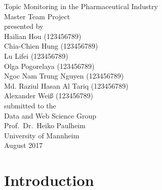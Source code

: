 \documentclass[11pt,titlepage,oneside,openany]{book}
\begin{document}
\begin{titlepage}
	\vspace*{2cm}
  \begin{center}
   {\Large Topic Monitoring in the Pharmaceutical Industry\\}
   \vspace{2cm} 
   {Master Team Project\\}
   \vspace{2cm}
   {presented by\\
    Hailian Hou (123456789)\\
    Chia-Chien Hung (123456789)\\
    Lu Lifei (123456789)\\
    Olga Pogorelaya (123456789)\\
    Ngoc Nam Trung Nguyen (123456789) \\
    Md. Raziul Hasan Al Tariq (123456789)\\
    Alexander Wei{\ss} (123456789)\\
   }
   \vspace{1cm} 
   {submitted to the\\
    Data and Web Science Group\\
    Prof.\ Dr.\ Heiko Paulheim\\
    University of Mannheim\\} \vspace{2cm}
   {August 2017}
  \end{center}
\end{titlepage} 

\tableofcontents
\newpage

\listofalgorithms

\listoffigures

\listoftables

\lstlistoflistings

\printglossary[type=\acronymtype,style=long, nonumberlist]


\newpage



\chapter{Introduction}
\label{cha:intro}
\end{document}
